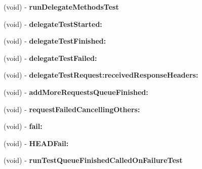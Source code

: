\begin{DoxyCompactItemize}
\item 
\hypertarget{interface_a_s_i_network_queue_tests_07_08_aac272d1e4ebf8932ab723637f3abe58c}{
(void) -\/ {\bfseries run\-Delegate\-Methods\-Test}}
\label{interface_a_s_i_network_queue_tests_07_08_aac272d1e4ebf8932ab723637f3abe58c}

\item 
\hypertarget{interface_a_s_i_network_queue_tests_07_08_ad63bd013de90e522e12f2bba603c20d7}{
(void) -\/ {\bfseries delegate\-Test\-Started\-:}}
\label{interface_a_s_i_network_queue_tests_07_08_ad63bd013de90e522e12f2bba603c20d7}

\item 
\hypertarget{interface_a_s_i_network_queue_tests_07_08_aa05a6ec84d2a71b363573187e70a6afa}{
(void) -\/ {\bfseries delegate\-Test\-Finished\-:}}
\label{interface_a_s_i_network_queue_tests_07_08_aa05a6ec84d2a71b363573187e70a6afa}

\item 
\hypertarget{interface_a_s_i_network_queue_tests_07_08_a3b74243c00c86e888ffc9cb271138dcb}{
(void) -\/ {\bfseries delegate\-Test\-Failed\-:}}
\label{interface_a_s_i_network_queue_tests_07_08_a3b74243c00c86e888ffc9cb271138dcb}

\item 
\hypertarget{interface_a_s_i_network_queue_tests_07_08_a46a23624618c0547cbcbb9ca82c798cb}{
(void) -\/ {\bfseries delegate\-Test\-Request\-:received\-Response\-Headers\-:}}
\label{interface_a_s_i_network_queue_tests_07_08_a46a23624618c0547cbcbb9ca82c798cb}

\item 
\hypertarget{interface_a_s_i_network_queue_tests_07_08_abe54bb28f6c58b48f2e136adebe7591c}{
(void) -\/ {\bfseries add\-More\-Requests\-Queue\-Finished\-:}}
\label{interface_a_s_i_network_queue_tests_07_08_abe54bb28f6c58b48f2e136adebe7591c}

\item 
\hypertarget{interface_a_s_i_network_queue_tests_07_08_ac13a2a0cfd430c066079f46e968de949}{
(void) -\/ {\bfseries request\-Failed\-Cancelling\-Others\-:}}
\label{interface_a_s_i_network_queue_tests_07_08_ac13a2a0cfd430c066079f46e968de949}

\item 
\hypertarget{interface_a_s_i_network_queue_tests_07_08_a672f203e09f2d4f39fb2f1824cd85443}{
(void) -\/ {\bfseries fail\-:}}
\label{interface_a_s_i_network_queue_tests_07_08_a672f203e09f2d4f39fb2f1824cd85443}

\item 
\hypertarget{interface_a_s_i_network_queue_tests_07_08_abebd73c6087a317cf7d40a0694fa0554}{
(void) -\/ {\bfseries \-H\-E\-A\-D\-Fail\-:}}
\label{interface_a_s_i_network_queue_tests_07_08_abebd73c6087a317cf7d40a0694fa0554}

\item 
\hypertarget{interface_a_s_i_network_queue_tests_07_08_a863286b45c212a9aff1fd8c9415e8eb8}{
(void) -\/ {\bfseries run\-Test\-Queue\-Finished\-Called\-On\-Failure\-Test}}
\label{interface_a_s_i_network_queue_tests_07_08_a863286b45c212a9aff1fd8c9415e8eb8}

\end{DoxyCompactItemize}


